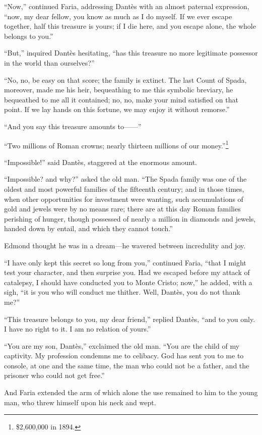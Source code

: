“Now,” continued Faria, addressing Dantès with an almost paternal
expression, “now, my dear fellow, you know as much as I do myself. If
we ever escape together, half this treasure is yours; if I die here,
and you escape alone, the whole belongs to you.”

“But,” inquired Dantès hesitating, “has this treasure no more
legitimate possessor in the world than ourselves?”

“No, no, be easy on that score; the family is extinct. The last Count
of Spada, moreover, made me his heir, bequeathing to me this symbolic
breviary, he bequeathed to me all it contained; no, no, make your mind
satisfied on that point. If we lay hands on this fortune, we may enjoy
it without remorse.”

“And you say this treasure amounts to——”

“Two millions of Roman crowns; nearly thirteen millions of our money.”\footnote[2]{\$2,600,000
in 1894.}

“Impossible!” said Dantès, staggered at the enormous amount.

“Impossible? and why?” asked the old man. “The Spada family was one of
the oldest and most powerful families of the fifteenth century; and in
those times, when other opportunities for investment were wanting, such
accumulations of gold and jewels were by no means rare; there are at
this day Roman families perishing of hunger, though possessed of nearly
a million in diamonds and jewels, handed down by entail, and which they
cannot touch.”

Edmond thought he was in a dream—he wavered between incredulity and
joy.

“I have only kept this secret so long from you,” continued Faria, “that
I might test your character, and then surprise you. Had we escaped
before my attack of catalepsy, I should have conducted you to Monte
Cristo; now,” he added, with a sigh, “it is you who will conduct me
thither. Well, Dantès, you do not thank me?”

“This treasure belongs to you, my dear friend,” replied Dantès, “and to
you only. I have no right to it. I am no relation of yours.”

“You are my son, Dantès,” exclaimed the old man. “You are the child of
my captivity. My profession condemns me to celibacy. God has sent you
to me to console, at one and the same time, the man who could not be a
father, and the prisoner who could not get free.”

And Faria extended the arm of which alone the use remained to him to
the young man, who threw himself upon his neck and wept.
